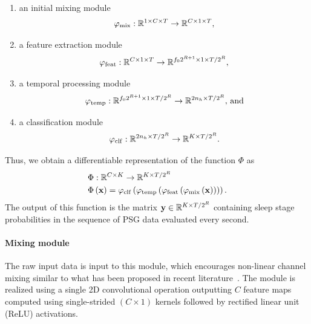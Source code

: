 \begin{enumerate}
    \item an initial mixing module 
    \begin{equation}
        \varphi_{\mathrm{mix}} : \mathbb{R}^{1 \times C \times T} \to \mathbb{R}^{C \times 1 \times T},
    \end{equation}%
	\item a feature extraction module
	\begin{equation}
	    \varphi_{\mathrm{feat}} : \mathbb{R}^{C \times 1 \times T} \to \mathbb{R}^{f_0 2^{R+1} \times 1 \times T/2^R},
	\end{equation}
	\item a temporal processing module
	\begin{equation}
	    \varphi_{\mathrm{temp}}     : \mathbb{R}^{f_0 2^{R+1} \times 1 \times T/2^R} \to \mathbb{R}^{2n_h \times T/2^R}, \, \text{and}
	\end{equation} %
	\item a classification module
	\begin{equation}
	    \varphi_{\mathrm{clf}} : \mathbb{R}^{2n_h \times T/2^R} \to \mathbb{R}^{K \times T/2^R}.
	\end{equation}%
\end{enumerate}
Thus, we obtain a differentiable representation of the function  $\Phi$ as
\begin{align}
\begin{split}
    &\Phi : \mathbb{R}^{C \times K} \to \mathbb{R}^{K \times T/2^R} \\
    &\Phi\left(\mathbf{x}\right) = \varphi_{\mathrm{clf}} \left( \varphi_{\mathrm{temp}} \left( \varphi_{\mathrm{feat}} \left( \varphi_{\mathrm{mix}} \left( \mathbf{x} \right) \right) \right) \right).
\end{split}
\end{align}
The output of this function is the matrix $\mathbf{y} \in \mathbb{R}^{K \times T/2^R}$ containing sleep stage probabilities in the sequence of PSG data evaluated every second.

\paragraph{Mixing module}
The raw input data is input to this module, which encourages non-linear channel mixing similar to what has been proposed in recent literature~\cite{Chambon2018c, Chambon2018b, Chambon2019, Olesen2019}.
The module is realized using a single 2D convolutional operation outputting $C$ feature maps computed using single-strided $(C \times 1)$ kernels followed by rectified linear unit (ReLU) activations.

